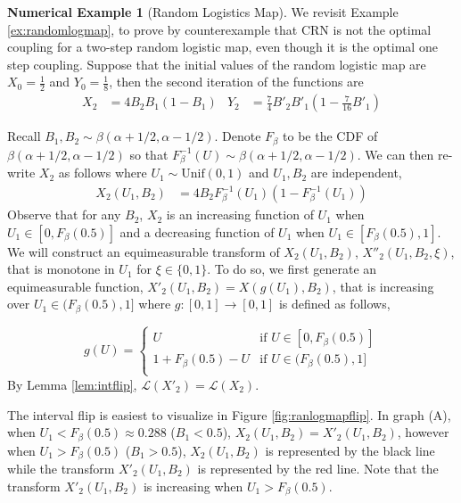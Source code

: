 \documentclass[12pt]{article}
\theoremstyle{plain}%
\theoremstyle{definition}
\newtheorem{numexmp}{Numerical Example}[section]
\def\unif{\mathrm{Unif}}
\begin{document}
\begin{numexmp}[Random Logistics Map]\label{numex:ranlogmap}
We revisit Example \ref{ex:randomlogmap}, to prove by counterexample that CRN is not the optimal coupling for a two-step random logistic map, even though it is the optimal one step coupling. Suppose that the initial values of the random logistic map are 
$X_0=\frac{1}{2}$ and $Y_0=\frac{1}{8}$, then the second iteration of the functions are
\begin{align}\label{eq:x2y2}
	X_2&=4B_2B_1(1-B_1) &
	Y_2&=\frac{7}{4}B'_2B'_1\left(1-\frac{7}{16}B'_1\right)
\end{align} 

Recall $B_1,B_2\sim \beta(\alpha+1/2,\alpha-1/2)$. Denote $F_{\beta}$ to be the CDF of $\beta(\alpha+1/2,\alpha-1/2)$ so that $F_{\beta}^{-1}(U)\sim \beta(\alpha+1/2,\alpha-1/2)$. We can then re-write $X_2$ as follows where $U_1\sim \unif(0,1)$ and $U_1, B_2$ are independent,
\begin{align*}
	X_2(U_1,B_2)&=4B_2F^{-1}_{\beta}(U_1)(1-F^{-1}_{\beta}(U_1))
\end{align*} 
Observe that for any $B_2$, $X_2$ is an increasing function of $U_1$ when $U_1\in [0,F_{\beta}(0.5)]$ and a decreasing function of $U_1$ when $U_1\in [F_{\beta}(0.5),1]$. We will construct an equimeasurable transform of $X_2(U_1, B_2)$, $X''_2(U_1, B_2, \xi)$, that is monotone in $U_1$ for $\xi\in \{0,1\}$.  To do so, we first generate an equimeasurable function, $X'_2(U_1,B_2)=X(g(U_1),B_2)$, that is increasing over $U_1\in (F_{\beta}(0.5),1]$ where $g:[0,1]\to[0,1]$ is defined as follows,
 
\begin{equation}\label{eq:g}
	g(U)=
	\begin{cases}
		U & \text{if } U\in [0,F_{\beta}(0.5)]\\
		1+F_{\beta}(0.5)-U & \text{if }U\in (F_{\beta}(0.5),1]\\
	\end{cases}
\end{equation}
By Lemma \ref{lem:intflip}, $\mathcal{L}(X'_2)=\mathcal{L}(X_2)$. 

The interval flip is easiest to visualize in Figure \ref{fig:ranlogmapflip}.  In graph (A), when $U_1<F_{\beta}(0.5)\approx 0.288$ ($B_1<0.5$), $X_2(U_1,B_2)=X'_2(U_1,B_2)$, however when $U_1>F_{\beta}(0.5)$ ($B_1>0.5$), $X_2(U_1,B_2)$ is represented by the black line while the transform $X'_2(U_1,B_2)$ is represented by the red line. Note that the transform  $X'_2(U_1,B_2)$ is increasing when $U_1>F_{\beta}(0.5)$.


\end{numexmp}
\end{document}
